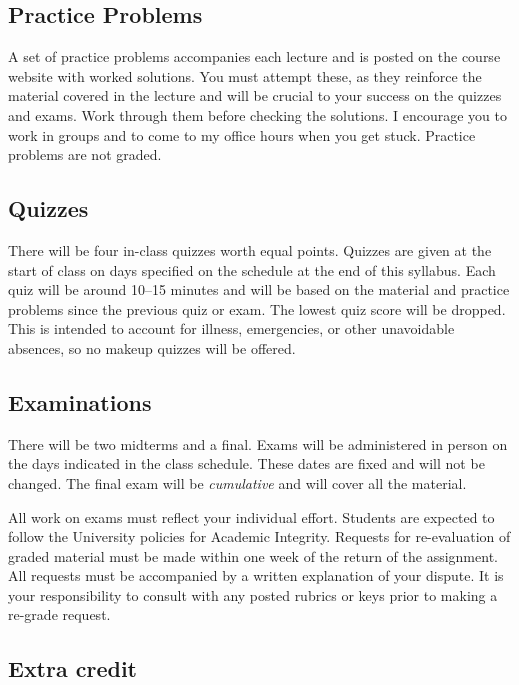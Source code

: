 \documentclass{./../latex/syllabus}
\begin{document}
\subsection*{Practice Problems}

A set of practice problems accompanies each lecture and is posted on the course website with worked solutions. You must attempt these, as they reinforce the material covered in the lecture and will be crucial to your success on the quizzes and exams. Work through them before checking the solutions. I encourage you to work in groups and to come to my office hours when you get stuck. Practice problems are not graded.

\subsection*{Quizzes}

There will be four in-class quizzes worth equal points. Quizzes are given at the start of class on days specified on the schedule at the end of this syllabus. Each quiz will be around 10--15 minutes and will be based on the material and practice problems since the previous quiz or exam. The lowest quiz score will be dropped. This is intended to account for illness, emergencies, or other unavoidable absences, so no makeup quizzes will be offered.

\subsection*{Examinations}

There will be two midterms and a final. Exams will be administered in person on the days indicated in the class schedule. These dates are fixed and will not be changed. The final exam will be \textit{cumulative} and will cover all the material.

All work on exams must reflect your individual effort. Students are expected to follow the University policies for Academic Integrity. Requests for re-evaluation of graded material must be made within one week of the return of the assignment. All requests must be accompanied by a written explanation of your dispute. It is your responsibility to consult with any posted rubrics or keys prior to making a re-grade request.

\subsection*{Extra credit}
\end{document}
